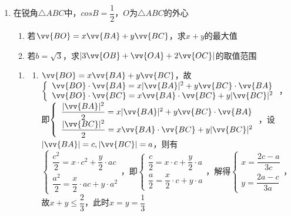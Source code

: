 \begin{enumerate}
\item 在锐角$\triangle{ABC}$中，$cosB = \dfrac{1}{2}$，$O$为$\triangle{ABC}$的外心
\begin{enumerate}
    \item 若$\vv{BO} = x\vv{BA} + y \vv{BC}$，求$x+y$的最大值
    \item 若$b = \sqrt{3}$，求$|3\vv{OB} + \vv{OA} + 2\vv{OC}|$的取值范围
\end{enumerate}
\begin{jieda}
    \begin{enumerate} 
        \item 
        \begin{enumerate}
            \item $\vv{BO} = x\vv{BA} + y \vv{BC}$，故$\left \{ \begin{array}{l}
                 \vv{BO} \cdot \vv{BA} = x|\vv{BA}|^2 + y \vv{BC}\cdot \vv{BA} \\
                 \vv{BO} \cdot \vv{BC} = x\vv{BA} \cdot \vv{BC} + y |\vv{BC}|^2
            \end{array}
            \right.$，\\
            即$\left \{ \begin{array}{l}
                 \dfrac{|\vv{BA}|^2}{2} = x|\vv{BA}|^2 + y \vv{BC}\cdot \vv{BA} \\
                 \dfrac{|\vv{BC}|^2}{2} = x\vv{BA} \cdot \vv{BC} + y |\vv{BC}|^2
            \end{array}
            \right.$，设$|\vv{BA}| = c, |\vv{BC}| = a$，则有\\
            $\left \{ \begin{array}{l}
                 \dfrac{c^2}{2} = x \cdot c^2 + \dfrac{y}{2} \cdot ac \\
                 \dfrac{a^2}{2} = \dfrac{x}{2} \cdot ac + y \cdot a^2
            \end{array}
            \right.$，即$\left \{ \begin{array}{l}
                 \dfrac{c}{2} = x \cdot c + \dfrac{y}{2} \cdot a \\
                 \dfrac{a}{2} = \dfrac{x}{2} \cdot c + y \cdot a
            \end{array}
            \right.$，解得$\left \{ \begin{array}{l}
                 x = \dfrac{2c-a}{3c} \\
                 y = \dfrac{2a-c}{3a}
            \end{array}
            \right.$，故$x+y \leq \dfrac{2}{3}$，此时$x = y = \dfrac{1}{3}$

\end{enumerate}
\end{enumerate}
\end{jieda}
\end{enumerate}
